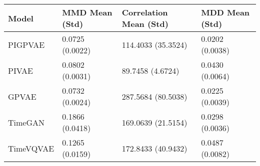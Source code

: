 \begin{tabular}{llll}
\toprule
Model & MMD Mean (Std) & Correlation Mean (Std) & MDD Mean (Std) \\
\midrule
PIGPVAE & 0.0725 (0.0022) & 114.4033 (35.3524) & 0.0202 (0.0038) \\
PIVAE & 0.0802 (0.0031) & 89.7458 (4.6724) & 0.0430 (0.0064) \\
GPVAE & 0.0732 (0.0024) & 287.5684 (80.5038) & 0.0225 (0.0039) \\
TimeGAN & 0.1866 (0.0418) & 169.0639 (21.5154) & 0.0298 (0.0036) \\
TimeVQVAE & 0.1265 (0.0159) & 172.8433 (40.9432) & 0.0487 (0.0082) \\
\bottomrule
\end{tabular}

